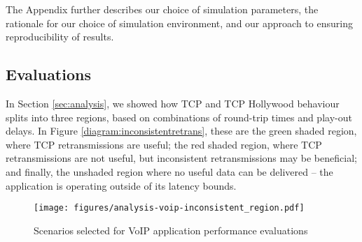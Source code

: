 The Appendix further describes our choice of simulation parameters, the
rationale for our choice of simulation environment, and our approach to
ensuring reproducibility of results.

\subsection{Evaluations}
\label{sec:eval}

In Section \ref{sec:analysis}, we showed how TCP and TCP Hollywood behaviour
splits into three regions, based on combinations of round-trip times and
play-out delays. In Figure \ref{diagram:inconsistentretrans}, these are
the green shaded
region, where TCP retransmissions are useful; the red shaded region, where TCP
retransmissions are not useful, but inconsistent retransmissions may be
beneficial; and finally, the unshaded region where no useful data can be
delivered -- the application is operating outside of its latency bounds.

\begin{figure}[t!]
	\texttt{[image: figures/analysis-voip-inconsistent\_region.pdf]}
    \caption{Scenarios selected for VoIP application performance evaluations}
   	\label{fig:analysis-voip}
\end{figure}

